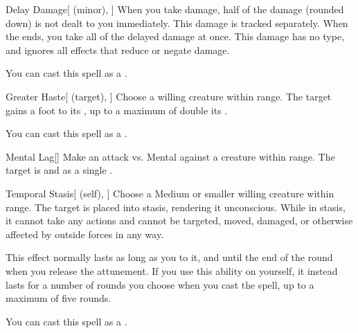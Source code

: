 \lowercase{\hypertarget{spell:Delay Damage}{}}\label{spell:Delay Damage}
\begin{freeability}[\nth{3}]{\hypertarget{spell:Delay Damage}{Delay Damage}}[ (minor), ]
When you take damage, half of the damage (rounded down) is not dealt to you immediately.
This damage is tracked separately.
When the ends, you take all of the delayed damage at once.
This damage has no type, and ignores all effects that reduce or negate damage.

You can cast this spell as a .
\end{freeability}
\vspace{0.25em}



\lowercase{\hypertarget{spell:Greater Haste}{}}\label{spell:Greater Haste}
\begin{attuneability}[\nth{3}]{\hypertarget{spell:Greater Haste}{Greater Haste}}[ (target), ]
Choose a willing creature within \rngmed range.
The target gains a  foot  to its , up to a maximum of double its .

You can cast this spell as a .
\end{attuneability}
\vspace{0.25em}



\lowercase{\hypertarget{spell:Mental Lag}{}}\label{spell:Mental Lag}
\begin{freeability}[\nth{3}]{\hypertarget{spell:Mental Lag}{Mental Lag}}[]
Make an attack vs. Mental against a creature within \rngmed range.
\hit The target is  and  as a single .
\end{freeability}
\vspace{0.25em}



\lowercase{\hypertarget{spell:Temporal Stasis}{}}\label{spell:Temporal Stasis}
\begin{attuneability}[\nth{3}]{\hypertarget{spell:Temporal Stasis}{Temporal Stasis}}[ (self), ]
Choose a Medium or smaller willing creature within \rngmed range.
The target is placed into stasis, rendering it unconscious.
While in stasis, it cannot take any actions and cannot be targeted, moved, damaged, or otherwise affected by outside forces in any way.

This effect normally lasts as long as you  to it, and until the end of the round when you release the attunement.
If you use this ability on yourself, it instead lasts for a number of rounds you choose when you cast the spell, up to a maximum of five rounds.

You can cast this spell as a .
\end{attuneability}
\vspace{0.25em}



